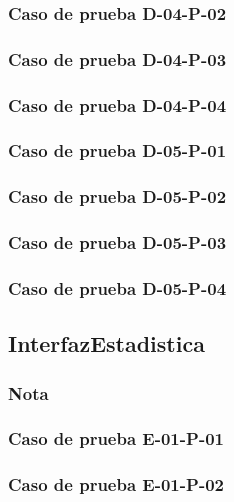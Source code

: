\documentclass[10pt,a4paper]{article}
\begin{document}
			\subsubsection{Caso de prueba D-04-P-02}

			\subsubsection{Caso de prueba D-04-P-03}

			\subsubsection{Caso de prueba D-04-P-04}

			\subsubsection{Caso de prueba D-05-P-01}

			\subsubsection{Caso de prueba D-05-P-02}

			\subsubsection{Caso de prueba D-05-P-03}

			\subsubsection{Caso de prueba D-05-P-04}

	\subsection{InterfazEstadistica}
			\subsubsection{Nota}

			\subsubsection{Caso de prueba E-01-P-01}

			\subsubsection{Caso de prueba E-01-P-02}
\end{document}
